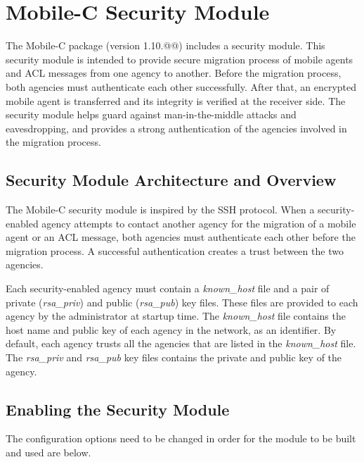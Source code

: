 \documentclass[11pt]{report}
\begin{document}
\chapter{Mobile-C Security Module \label{chap:Security}}
The Mobile-C package (version 1.10.@@) includes a security module. 
This security module is intended to provide secure migration process of 
  mobile agents and ACL messages from one agency to another. 
Before the migration process, both agencies must authenticate each other 
  successfully. 
After that, an encrypted mobile agent is transferred and its integrity 
  is verified at the receiver side. 
The security module helps guard against man-in-the-middle attacks and
  eavesdropping, and provides a strong authentication of the 
  agencies involved in the migration process.

\section{Security Module Architecture and Overview}
The Mobile-C security module is inspired by the SSH protocol.
When a security-enabled agency attempts to contact another agency for 
  the migration of a mobile agent or an ACL message, both
  agencies must authenticate each other before the  migration process. 
A successful authentication creates a trust between the two agencies.

Each security-enabled agency must contain a \textit{known\_host} file 
  and a pair of private (\textit{rsa\_priv}) and public (\textit{rsa\_pub}) 
  key files.
These files are provided to each agency by the administrator at 
  startup time. 
The \textit{known\_host} file contains the host name and public key 
  of each agency in the network, as an identifier. 
By default, each agency trusts all the agencies that are listed 
  in the \textit{known\_host} file. 
The \textit{rsa\_priv} and \textit{rsa\_pub} key files contains the 
  private and public key of the agency.



\section {Enabling the Security Module}
The configuration options need to be changed in order for the module 
to be built and used are below.
\end{document}
